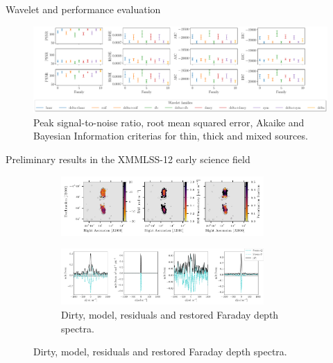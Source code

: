 \documentclass[xetex,aspectratio=169]{beamer}
\begin{document}
\begin{frame}{Wavelet and performance evaluation}
	\begin{figure}
		\centering
		\includegraphics[width=\textwidth]{figures/wavelets/families_wavelets_meerkat.pdf}
		\caption*{Peak signal-to-noise ratio, root mean squared error, Akaike and Bayesian Information criterias for thin, thick and mixed sources.}

	\end{figure}
\end{frame}


\begin{frame}{Preliminary results in the XMMLSS-12 early science field}

	\begin{figure}
		\centering
		\begin{subfigure}{\textwidth}
			\centering
			\includegraphics[width=0.85\textwidth]{figures/plot_rm.pdf}
		\end{subfigure}
		\begin{subfigure}{\textwidth}
			\centering
			\includegraphics[width=0.85\textwidth]{figures/los.pdf}
			\caption{Dirty, model, residuals and restored Faraday depth spectra.}
		\end{subfigure}

	\end{figure}
\end{frame}
\end{document}
